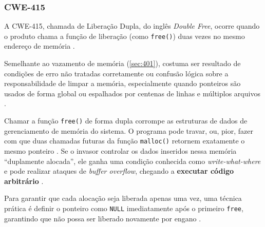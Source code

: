 \documentclass[
    12pt,                %
    openright,           %
    oneside,             %
    a4paper,             %
    english,             %
    brazil               %
]{abntex2}
\begin{document}
\subsubsection{CWE-415}
\label{sec:415}
\par
A CWE-415, chamada de Liberação Dupla, do inglês \textit{Double Free}, ocorre quando o produto chama a função de liberação (como \texttt{free()}) duas vezes no mesmo endereço de memória \cite{cwe415}.
\par
Semelhante ao vazamento de memória (\ref{sec:401}), costuma ser resultado de condições de erro não tratadas corretamente ou confusão lógica sobre a responsabilidade de limpar a memória, especialmente quando ponteiros são usados de forma global ou espalhados por centenas de linhas e múltiplos arquivos \cite{cwe415}.
\par
Chamar a função \texttt{free()} de forma dupla corrompe as estruturas de dados de gerenciamento de memória do sistema.
O programa pode travar, ou, pior, fazer com que duas chamadas futuras da função \texttt{malloc()} retornem exatamente o mesmo ponteiro \cite{cwe415}.
Se o invasor controlar os dados inseridos nessa memória ``duplamente alocada'', ele ganha uma condição conhecida como \textit{write-what-where} e pode realizar ataques de \textit{buffer overflow}, chegando a \textbf{executar código arbitrário} \cite{cwe415}.
\par
Para garantir que cada alocação seja liberada apenas uma vez, uma técnica prática é definir o ponteiro como \texttt{NULL} imediatamente após o primeiro \texttt{free}, garantindo que não possa ser liberado novamente por engano \cite{cwe415}.
\end{document}
